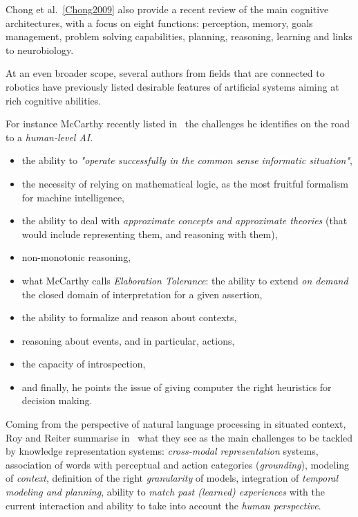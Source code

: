 Chong et al.~\ref{Chong2009} also provide a recent review of the main cognitive
architectures, with a focus on eight functions: perception, memory, goals
management, problem solving capabilities, planning, reasoning, learning and
links to neurobiology.

At an even broader scope, several authors from fields that are connected to
robotics have previously listed desirable features of artificial systems aiming
at rich cognitive abilities.

For instance McCarthy recently listed in~\cite{McCarthy2007} the challenges he
identifies on the road to a \emph{human-level AI}.

\begin{itemize}

	\item the ability to \emph{"operate successfully in the common sense
	informatic situation"},

	\item the necessity of relying on mathematical logic, as the most fruitful
	formalism for machine intelligence,

	\item the ability to deal with \emph{approximate concepts and approximate
	theories} (that would include representing them, and reasoning with them),

	\item non-monotonic reasoning,

	\item what McCarthy calls \emph{Elaboration Tolerance}: the ability to
	extend \emph{on demand} the closed domain of interpretation for a
	given assertion,

	\item the ability to formalize and reason about contexts,

	\item reasoning about events, and in particular, actions,

	\item the capacity of introspection,

	\item and finally, he points the issue of giving computer the right
	heuristics for decision making.

\end{itemize}

Coming from the perspective of natural language processing in situated context,
Roy and Reiter summarise in~\cite{Roy2005} what they see as the main challenges
to be tackled by knowledge representation systems: \emph{cross-modal
representation} systems, association of words with perceptual and action
categories (\emph{grounding}), modeling of \emph{context}, definition of the
right \emph{granularity} of models, integration of \emph{temporal modeling and
planning}, ability to \emph{match past (learned) experiences} with the current
interaction and ability to take into account the \emph{human perspective}.

